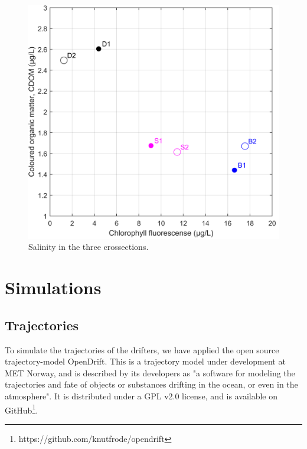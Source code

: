 \documentclass[12pt,a4paper,english]{article}
\begin{document}
\begin{figure}[ht]
\centerline{
\includegraphics*[width=\textwidth]{Figurer/CF_diagram.png}}
\caption{\small
Salinity in the three crossections.}
\label{fig:CFdiagram}
\end{figure}

\clearpage

\section{Simulations}

\subsection{Trajectories}
\label{sect:trajmod}
To simulate the trajectories of the drifters, we have applied the open source trajectory-model OpenDrift. This is a trajectory model under development at MET Norway, and is described by its developers as "a software for modeling the trajectories and fate of objects or substances drifting in the ocean, or even in the atmosphere". It is distributed under a GPL v2.0 license, and is available on GitHub\footnote{https://github.com/knutfrode/opendrift}.
\end{document}
